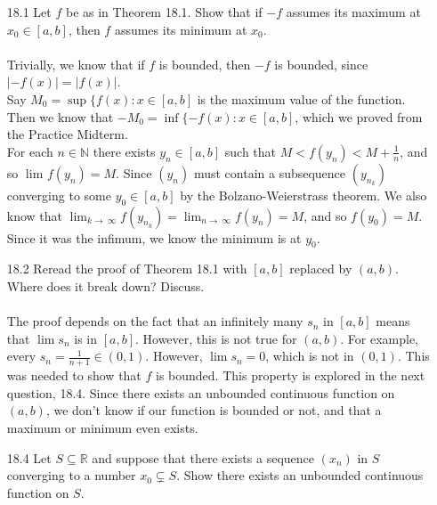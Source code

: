 
\usepackage{amsmath, amssymb, dsfont}

\oddsidemargin 0in
\evensidemargin 0in
\textwidth 6.5in
\topmargin -0.5in
\textheight 9.0in
\newcommand{\norm}[1]{\left\lVert #1 \right\rVert}
\newcommand{\abs}[1]{\left\vert #1 \right\vert}
\newcommand{\?}{\stackrel{?}{=}}



\pagestyle{myheadings}

\begin{enumerate}
  \item [18.1]
    Let $f$ be as in Theorem 18.1. Show that if $-f$ assumes its maximum at $x_0 \in [a,b]$, then $f$ assumes its minimum at $x_0$.\\\\

    Trivially, we know that if $f$ is bounded, then $-f$ is bounded, since $\abs{-f(x)} = \abs{f(x)}$.\\

    Say $M_0 = \sup \{f(x) : x \in [a,b]$ is the maximum value of the function. Then we know that $-M_0 = \inf \{-f(x) : x \in [a,b]$, which we proved from the Practice Midterm.\\

    For each $n \in \mathds{N}$ there exists $y_n \in [a,b]$ such that $M < f(y_n) < M + \frac{1}{n}$, and so $\lim_{} f(y_n) = M$. Since $(y_n)$ must contain a subsequence $(y_{n_k})$ converging to some $y_0 \in [a,b]$ by the Bolzano-Weierstrass theorem. We also know that $\lim_{k \to\ \infty} f(y_{n_k}) = \lim_{n \to\ \infty} f(y_n) = M$, and so $f(y_0) = M$. Since it was the infimum, we know the minimum is at $y_0$.
  \item [18.2]
    Reread the proof of Theorem 18.1 with $[a,b]$ replaced by $(a,b)$. Where does it break down? Discuss.\\\\

    The proof depends on the fact that an infinitely many $s_n$ in $[a,b]$ means that $\lim s_n$ is in $[a,b]$. However, this is not true for $(a,b)$. For example, every $s_n = \frac{1}{n+1} \in (0,1)$. However, $\lim s_n = 0$, which is not in $(0,1)$. This was needed to show that $f$ is bounded. This property is explored in the next question, 18.4. Since there exists an unbounded continuous function on $(a,b)$, we don't know if our function is bounded or not, and that a maximum or minimum even exists.
  \item [18.4]
    Let $S \subseteq \mathds{R}$ and suppose that there exists a sequence $(x_n)$ in $S$ converging to a number $x_0 \subsetneq S$. Show there exists an unbounded continuous function on $S$.\\\\


\end{enumerate}
